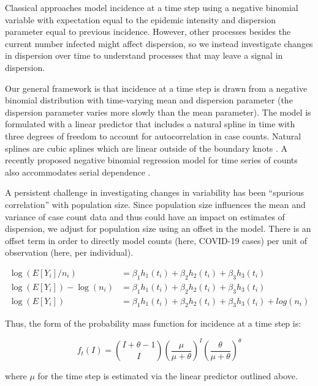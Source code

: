 \documentclass[10pt,letterpaper]{article}
\begin{document}
Classical approaches \cite{grenfell_dynamics_2002} model incidence at a time step using a negative binomial variable with expectation equal to the epidemic intensity and dispersion parameter equal to previous incidence. However, other processes besides the current number infected might affect dispersion, so we instead investigate changes in dispersion over time to understand processes that may leave a signal in dispersion. 

Our general framework is that incidence at a time step is drawn from a negative binomial distribution with time-varying mean and dispersion parameter (the dispersion parameter varies more slowly than the mean parameter). 
The model is formulated with a linear predictor that includes a natural spline in time with three degrees of freedom to account for autocorrelation in case counts. 
Natural splines are cubic splines which are linear outside of the boundary knots \cite{perperoglou_review_2019}. 
A recently proposed negative binomial regression model for time series of counts also accommodates serial dependence \cite{davis_negative_2009}. 

A persistent challenge in investigating changes in variability has been ``spurious correlation'' with population size. 
Since population size influences the mean and variance of case count data and thus could have an impact on estimates of dispersion, we adjust for population size using an offset in the model. 
There is an offset term in order to directly model counts (here, COVID-19 cases) per unit of observation (here, per individual).

\begin{align}
  \log(E[Y_i]/n_i) &= \beta_1h_1(t_i) + \beta_2h_2(t_i) + \beta_3h_3(t_i) \\
  \log(E[Y_i])-\log(n_i) &= \beta_1h_1(t_i) + \beta_2h_2(t_i) + \beta_3h_3(t_i) \\ 
  \log(E[Y_i]) &= \beta_1 h_1(t_i) + \beta_2h_2(t_i) + \beta_3 h_3(t_i) + log(n_i) 
\end{align}

Thus, the form of the probability mass function for incidence at a time step is:

\begin{equation}
  f_t(I) = \binom{I + \theta - 1}{I} \left(\dfrac{\mu}{\mu+\theta}\right)^I \left(\dfrac{\theta}{\mu +\theta}\right)^\theta
\end{equation}

where \begin{math}\mu\end{math} for the time step is estimated via the linear predictor outlined above.
\end{document}
